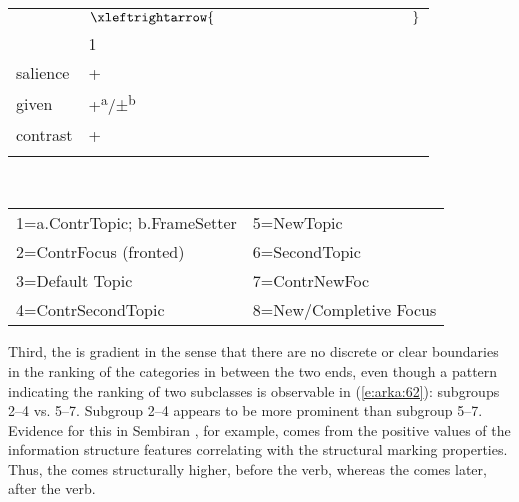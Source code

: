 \documentclass[output=paper
,modfonts
,nonflat]{langsci/langscibook}
\begin{document}
\begin{exe}
\ex\label{e:arka:62}
\begin{tabular}[t]{lllllllll}
	\lsptoprule
	& \multicolumn{8}{c}{$\xleftrightarrow{\hspace{5cm}}$}\\
	& 1 & \cellcolor[gray]{0.8}{2} & \cellcolor[gray]{0.8}{3} & \cellcolor[gray]{0.8}{4} & \cellcolor[gray]{0.7}{5} & \cellcolor[gray]{0.7}{6} & \cellcolor[gray]{0.7}{7} & \cellcolor[gray]{0.6}{8}\\
	\raggedleft salience & + & \cellcolor[gray]{0.8}{+} & \cellcolor[gray]{0.8}{+} & \cellcolor[gray]{0.8}{–} & \cellcolor[gray]{0.7}{+} & \cellcolor[gray]{0.7}{–} & \cellcolor[gray]{0.7}{–} & \cellcolor[gray]{0.6}{–}\\
	\raggedleft given & +\textsuperscript{a}/±\textsuperscript{b} & \cellcolor[gray]{0.8}{–} & \cellcolor[gray]{0.8}{+} & \cellcolor[gray]{0.8}{+} & \cellcolor[gray]{0.7}{–} & \cellcolor[gray]{0.7}{+} & \cellcolor[gray]{0.7}{–} & \cellcolor[gray]{0.6}{–}\\
	\raggedleft contrast & + & \cellcolor[gray]{0.8}{+} & \cellcolor[gray]{0.8}{–} & \cellcolor[gray]{0.8}{+} & \cellcolor[gray]{0.7}{–} & \cellcolor[gray]{0.7}{–} & \cellcolor[gray]{0.7}{+} & \cellcolor[gray]{0.6}{–}\\
	\lspbottomrule
\end{tabular}\\
\begin{tabular}{ll}
1=a.ContrTopic; b.FrameSetter & 5=NewTopic  \\
2=ContrFocus (fronted) & 6=SecondTopic\\
3=Default Topic    & 7=ContrNewFoc    \\
4=ContrSecondTopic & 8=New/Completive Focus
\end{tabular}
\end{exe}

\noindent
Third, the  is gradient in the sense that there are no discrete or clear boundaries in the ranking of the categories in between the two ends, even though a pattern indicating the ranking of two subclasses is observable in (\ref{e:arka:62}): subgroups 2--4 vs. 5--7. Subgroup 2--4 appears to be more prominent than subgroup 5--7. Evidence for this in Sembiran , for example, comes from the positive values of the information structure features correlating with the structural marking properties. Thus, the  comes structurally higher, before the verb, whereas the  comes later, after the verb.  
\end{document}
